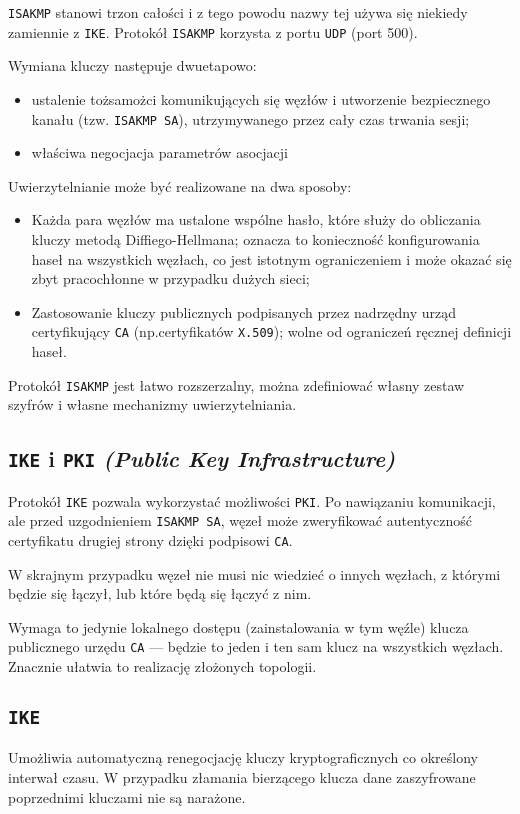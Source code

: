\documentclass{article}
\begin{document}
{\tt ISAKMP} stanowi trzon całości i z tego powodu nazwy tej używa się niekiedy zamiennie z {\tt IKE}.
Protokół {\tt ISAKMP} korzysta z portu {\tt UDP} (port 500).

Wymiana kluczy następuje dwuetapowo:

\begin{itemize}
  \item ustalenie tożsamożci komunikujących się węzłów i utworzenie bezpiecznego kanału (tzw. {\tt ISAKMP SA}), utrzymywanego przez cały czas trwania sesji;
  \item właściwa negocjacja parametrów asocjacji
\end{itemize}

Uwierzytelnianie może być realizowane na dwa sposoby:
\begin{itemize}
  \item Każda para węzłów ma ustalone wspólne hasło, które służy do obliczania kluczy metodą Diffiego-Hellmana; oznacza to konieczność konfigurowania haseł na wszystkich węzłach, co jest istotnym ograniczeniem i może okazać się zbyt pracochłonne w przypadku dużych sieci;
  \item Zastosowanie kluczy publicznych podpisanych przez nadrzędny urząd certyfikujący {\tt CA} (np.\@ certyfikatów {\tt X.509}); wolne od ograniczeń ręcznej definicji haseł.
\end{itemize}

Protokół {\tt ISAKMP} jest łatwo rozszerzalny, można zdefiniować własny zestaw szyfrów i własne mechanizmy uwierzytelniania.

\subsection{{\tt IKE} i {\tt PKI} \emph{(Public Key Infrastructure)}}

Protokół {\tt IKE} pozwala wykorzystać możliwości {\tt PKI}. Po nawiązaniu komunikacji, ale przed uzgodnieniem {\tt ISAKMP SA}, węzeł może zweryfikować autentyczność certyfikatu drugiej strony dzięki podpisowi {\tt CA}.

W skrajnym przypadku węzeł nie musi nic wiedzieć o innych węzłach, z którymi będzie się łączył, lub które będą się łączyć z nim.

Wymaga to jedynie lokalnego dostępu (zainstalowania w tym węźle) klucza publicznego urzędu {\tt CA} --- będzie to jeden i ten sam klucz na wszystkich węzłach. Znacznie ułatwia to realizację złożonych topologii.
\pagebreak
\subsection{\tt IKE}
Umożliwia automatyczną renegocjację kluczy kryptograficznych co określony interwał czasu.
W przypadku złamania bierzącego klucza dane zaszyfrowane poprzednimi kluczami nie są narażone.
\end{document}
